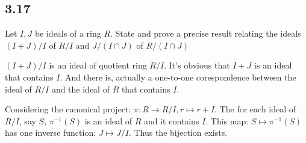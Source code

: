 \documentclass[a4paper, pdf, 12pt]{article}
\makeatletter
\renewenvironment{proof}[1][\proofname]{\par
  \pushQED{\qed}%
  \normalfont \topsep6\p@\@plus6\p@\relax
  \trivlist
  \item[%
    \hskip\labelsep
    \normalfont\bfseries %
    #1%
    \@addpunct{.}%
  ]\ignorespaces
}{%
  \popQED\endtrivlist\@endpefalse
}
\let\qed\relax %
\DeclareRobustCommand{\qed}{%
  \ifmmode \mathqed
  \else
    \leavevmode\unskip\penalty\@M\hbox{}\nobreak\hspace{.5em minus .1em}%
    \hbox{\qedsymbol}%
  \fi
}
\makeatother
\begin{document}
\subsection*{3.17}
Let $I, J$ be ideals of a ring $R$. State and prove a precise result relating the
ideals $(I + J)/I$ of $R/I$ and $J/(I \cap J)$ of $R/(I \cap J)$
\begin{proof}
  $(I + J)/I$ is an ideal of quotient ring $R/I$. It's obvious that $I+J$ is an
  ideal that contains $I$. And there is, actually a one-to-one corespondence between 
  the ideal of $R/I$ and the ideal of $R$ that contains $I$. 

  Considering the canonical project: $\pi: R\rightarrow R/I, r\mapsto r+I$. The for each 
  ideal of $R/I$, say $S$, $\pi^{-1}(S)$ is an ideal of $R$ and it contains $I$. This 
  map: $S\mapsto \pi^{-1}(S)$ has one inverse function: $J\mapsto J/I$. Thus the bijection 
  exists.
\end{proof}
\end{document}
